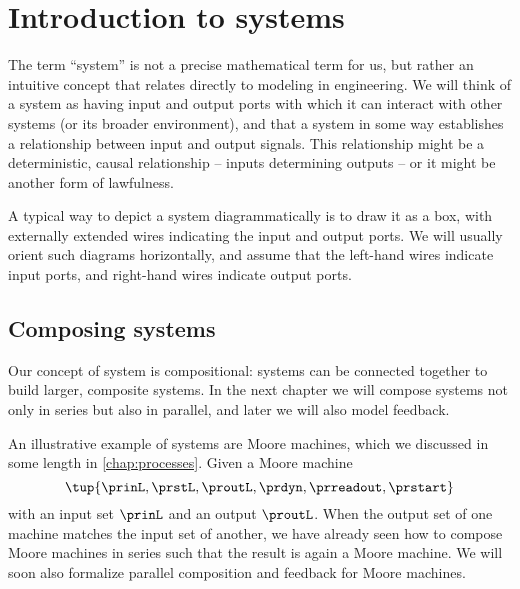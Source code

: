 
\section{Introduction to systems}


The term ``system'' is not a precise mathematical term for us, but rather an intuitive concept that relates directly to modeling in engineering.
We will think of a system as having input and output ports with which it can interact with other systems (or its broader environment), and that a system in some way establishes a relationship between input and output signals.
This relationship might be a deterministic, causal relationship -- inputs determining outputs -- or it might be another form of lawfulness.

A typical way to depict a system diagrammatically is to draw it as a box, with externally extended wires indicating the input and output ports.
We will usually orient such diagrams horizontally, and assume that the left-hand wires indicate input ports, and right-hand wires indicate output ports.


\subsection{Composing systems}

Our concept of system is compositional: systems can be connected together to build larger, composite systems.
In the next chapter we will compose systems not only in series but also in parallel, and later we will also model feedback.

An illustrative example of systems are Moore machines, which we discussed in some length in \cref{chap:processes}.
Given a Moore machine
\begin{equation}
    \label{eq:moore-machine-specification}
    \tup{\prinL,\prstL,\proutL,\prdyn,\prreadout,\prstart}
\end{equation}
with an input set $\prinL$ and an output $\proutL$.
When the output set of one machine matches the input set of another, we have already seen how to compose Moore machines in series such that the result is again a Moore machine.
We will soon also formalize parallel composition and feedback for Moore machines.

